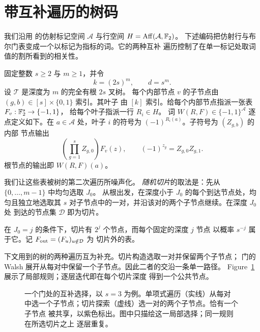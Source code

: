 \section{带互补遍历的树码}
\label{sec:tree}

我们沿用  的仿射标记空间 $\mathcal A$ 与行空间
$H=\operatorname{Aff}(\mathcal A,\mathbb F_2)$。
下述编码把仿射行与布尔门表变成一个以标记为指标的词。它的两种互补
遍历控制了在单一标记处取词值的割所看到的相关性。

\begin{definition}[树码]
\label{def:tree-code}
固定整数 $s\ge2$ 与 $m\ge1$，并令
\[
 k=(2s)^m,\qquad d=s^m.
\]
设 $\mathcal T$ 是深度为 $m$ 的完全有根 $2s$ 叉树。
每个内部节点 $v$ 的子节点由 $(g,b)\in[s]\times\{0,1\}$ 索引。其叶子
由 $[k]$ 索引。给每个内部节点指派一张表 $F_v:\mathbb F_2^s\to\{-1,1\}$，
给每个叶子指派一行 $R_i\in H$。
词 $W(R,F)\in\{-1,1\}^{\mathcal A}$ 逐点定义如下。在 $a\in\mathcal A$
处，叶子 $i$ 的符号为 $(-1)^{R_i(a)}$。子符号为 $(Z_{g,b})$ 的内部
节点输出
\begin{equation}
 \left(\prod_{g=1}^s Z_{g,0}\right)F_v(z),
 \qquad (-1)^{z_g}=Z_{g,0}Z_{g,1}.
 \label{eq:gate-rule}
\end{equation}
根节点的输出即 $W(R,F)(a)$。
\end{definition}

我们让这些表被树的第二次遍历所噪声化。
\emph{随机切片}的取法是：先从 $\{0,\ldots,m-1\}$ 中均匀选取 $J_0$。
从根出发，在深度小于 $J_0$ 的每个到达节点处，均匀且独立地选取其
$s$ 对子节点中的一对，并沿该对的两个子节点继续。在深度 $J_0$ 处
到达的节点集 $\mathcal D$ 即为切片。

在 $J_0=j$ 的条件下，切片有 $2^j$ 个节点，而每个固定的深度 $j$ 节点
以概率 $s^{-j}$ 属于它。记 $F_{\rm out}=(F_u)_{u\notin\mathcal D}$ 为
切片外的表。

下文用到的树的两种遍历互为补充。切片构造选取一对并保留两个子节点；
门的 Walsh 展开从每对中保留一个子节点。因此二者的交沿一条单一路径。
Figure~\ref{fig:traversals} 展示了局部规则；逐层迭代即在每个切片深度
得到一个公共节点。

\begin{figure}[ht]
\centering

\caption{一个门处的互补选择，以 $s=3$ 为例。单项式遍历（实线）从每对
中选一个子节点；切片探索（虚线）选一对的两个子节点。恰有一个子节点
被共享，以紫色标出。图中只描绘这一局部选择；同一规则在所选切片之上
逐层重复。}
\label{fig:traversals}
\end{figure}

